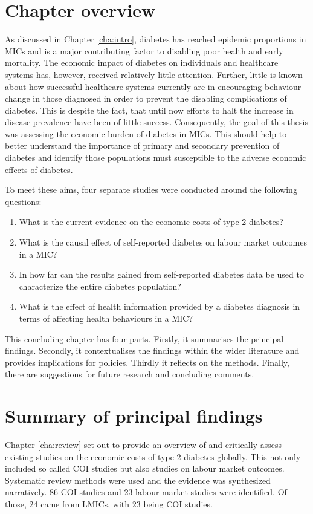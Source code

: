 \section{Chapter overview}
As discussed in Chapter \ref{cha:intro}, diabetes has reached epidemic proportions in \acp{MIC} and is a major contributing factor to disabling poor health and early mortality. The economic impact of diabetes on individuals and healthcare systems has, however, received relatively little attention. Further, little is known about how successful healthcare systems currently are in encouraging behaviour change in those diagnosed in order to prevent the disabling complications of diabetes. This is despite the fact, that until now efforts to halt the increase in disease prevalence have been of little success. Consequently, the goal of this thesis was assessing the economic burden of diabetes in \acp{MIC}. This should help to better understand the importance of primary and secondary prevention of diabetes and identify those populations must susceptible to the adverse economic effects of diabetes.

To meet these aims, four separate studies were conducted around the following questions:
\begin{enumerate}
\item What is the current evidence on the economic costs of type 2 diabetes?
\item What is the causal effect of self-reported diabetes on labour market outcomes in a \ac{MIC}?
\item In how far can the results gained from self-reported diabetes data be used to characterize the entire diabetes population?
\item What is the effect of health information provided by a diabetes diagnosis in terms of affecting health behaviours in a \ac{MIC}?
\end{enumerate}

This concluding chapter has four parts. Firstly, it summarises the principal findings. Secondly, it contextualises the findings within the wider literature and provides implications for policies. Thirdly it reflects on the methods. Finally, there are suggestions for future research and concluding comments.

\section{Summary of principal findings}

Chapter \ref{cha:review} set out to provide an overview of and critically assess existing studies on the economic costs of type 2 diabetes globally. This not only included so called \ac{COI} studies but also studies on labour market outcomes. Systematic review methods were used and the evidence was synthesized narratively. 86 \ac{COI} studies and 23 labour market studies were identified. Of those, 24 came from \acp{LMIC}, with 23 being \ac{COI} studies.


